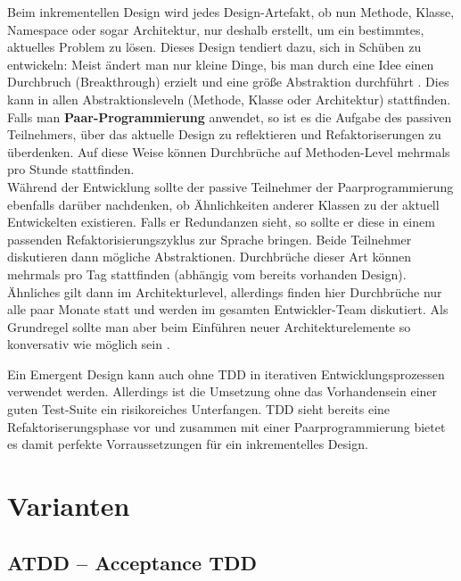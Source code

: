 Beim inkrementellen Design wird jedes Design-Artefakt, ob nun Methode, Klasse, Namespace oder sogar Architektur, nur deshalb erstellt, um ein bestimmtes, aktuelles Problem zu lösen. Dieses Design tendiert dazu, sich in Schüben zu entwickeln: Meist ändert man nur kleine Dinge, bis man durch eine Idee einen Durchbruch (Breakthrough) erzielt und eine größe Abstraktion durchführt \cite{shore_art_2007,evans_domain_driven_2003}. Dies kann in allen Abstraktionsleveln (Methode, Klasse oder Architektur) stattfinden.\\
Falls man \textbf{Paar-Programmierung} anwendet, so ist es die Aufgabe des passiven Teilnehmers, über das aktuelle Design zu reflektieren und Refaktoriserungen zu überdenken. Auf diese Weise können Durchbrüche auf Methoden-Level mehrmals pro Stunde stattfinden.\\
Während der Entwicklung sollte der passive Teilnehmer der Paarprogrammierung ebenfalls darüber nachdenken, ob Ähnlichkeiten anderer Klassen zu der aktuell Entwickelten existieren. Falls er Redundanzen sieht, so sollte er diese in einem passenden Refaktorisierungszyklus zur Sprache bringen. Beide Teilnehmer diskutieren dann mögliche Abstraktionen. Durchbrüche dieser Art können mehrmals pro Tag stattfinden (abhängig vom bereits vorhanden Design).\\
Ähnliches gilt dann im Architekturlevel, allerdings finden hier Durchbrüche nur alle paar Monate statt und werden im gesamten Entwickler-Team diskutiert. Als Grundregel sollte man aber beim Einführen neuer Architekturelemente so konversativ wie möglich sein \citep{shore_art_2007}.

Ein Emergent Design kann auch ohne TDD in iterativen Entwicklungsprozessen verwendet werden. Allerdings ist die Umsetzung ohne das Vorhandensein einer guten Test-Suite ein risikoreiches Unterfangen. TDD sieht bereits eine Refaktoriserungsphase vor und zusammen mit einer Paarprogrammierung bietet es damit perfekte Vorraussetzungen für ein inkrementelles Design.

\section{Varianten}
\subsection{ATDD -- Acceptance TDD}
\label{sec:attd}

